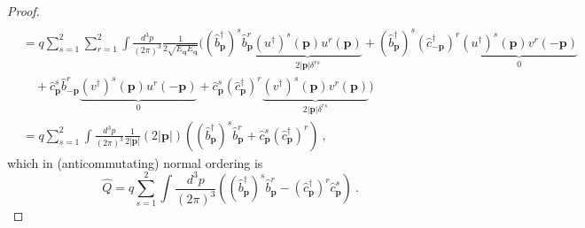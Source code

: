 \begin{proof}
\begin{equation*}
\begin{aligned}
        \end{aligned}
        \end{equation*} 
        \begin{equation*}
        \begin{aligned}
            & = q \sum_{s=1}^{2} \sum_{r=1}^{2} \int \frac{d^3 p}{(2\pi)^3} \frac{1}{2 \sqrt{E_{\mathbf q} E_{\mathbf q}}}  \Big ( (\hat b^\dagger_{\mathbf p})^s \hat b^r_{\mathbf p} \underbrace{(u^\dagger)^s (\mathbf p) u^r (\mathbf p)}_{2 |\mathbf p| \delta^{rs}} + (\hat b^\dagger_{\mathbf p})^s (\hat c_{ - \mathbf p}^\dagger)^r \underbrace{(u^\dagger)^s (\mathbf p) v^r( -\mathbf p)}_0 \\ & \quad + \hat c^s_{\mathbf p} \hat b^r_{ - \mathbf p} \underbrace{(v^\dagger)^s (\mathbf p) u^r ( - \mathbf p)}_0 + \hat c^s_{\mathbf p} (\hat c_{\mathbf p}^\dagger)^r \underbrace{(v^\dagger)^s(\mathbf p) v^r(\mathbf p)}_{2 |\mathbf p| \delta^{rs}}  \Big ) \\ & = q \sum_{s=1}^{2} \int \frac{d^3 p}{(2\pi)^3} \frac{1}{2 |\mathbf p|} (2 |\mathbf p|) ((\hat b^\dagger_{\mathbf p})^s \hat b^r_{\mathbf p} + \hat c^s_{\mathbf p} (\hat c_{\mathbf p}^\dagger)^r) ~,
        \end{aligned}
        \end{equation*}
        which in (anticommutating) normal ordering is 
        \begin{equation*}
            \hat Q = q \sum_{s=1}^{2} \int \frac{d^3 p}{(2\pi)^3} ((\hat b^\dagger_{\mathbf p})^s \hat b^r_{\mathbf p} - (\hat c_{\mathbf p}^\dagger)^r \hat c^s_{\mathbf p}) ~.
        \end{equation*}
    \end{proof}

